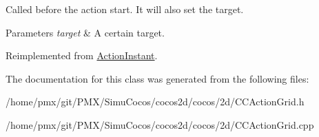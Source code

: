 Called before the action start. It will also set the target.


\begin{DoxyParams}{Parameters}
{\em target} & A certain target. \\
\hline
\end{DoxyParams}


Reimplemented from \hyperlink{classActionInstant_a47cff49ef73e126e5e9d6c26872a9e23}{Action\+Instant}.



The documentation for this class was generated from the following files\+:\begin{DoxyCompactItemize}
\item 
/home/pmx/git/\+P\+M\+X/\+Simu\+Cocos/cocos2d/cocos/2d/C\+C\+Action\+Grid.\+h\item 
/home/pmx/git/\+P\+M\+X/\+Simu\+Cocos/cocos2d/cocos/2d/C\+C\+Action\+Grid.\+cpp\end{DoxyCompactItemize}
